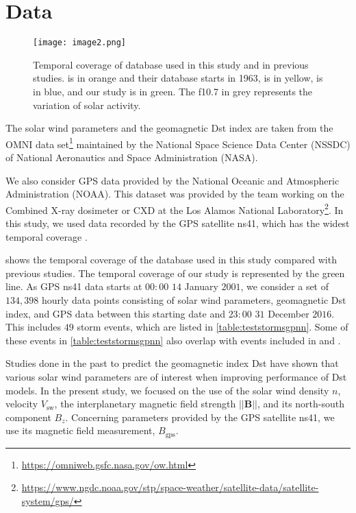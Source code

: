 \section{Data}\label{sec:datagpnn}

\begin{figure}
	\texttt{[image: image2.png]}
	\caption{Temporal coverage of database used in this study and in previous studies. \citet{wu1997geomagnetic} 
	is in orange and their database starts in 1963, \citet{Bala2012} is in yellow, \citet{Lazzus} is in blue, and our study is in green. 
	The f10.7 in grey represents the variation of solar activity.}
	\label{fig:datacoverage}
\end{figure}


The solar wind parameters and the geomagnetic Dst index are taken from the OMNI data 
set\footnote{\url{https://omniweb.gsfc.nasa.gov/ow.html}} maintained by the National Space Science 
Data Center (NSSDC) of National Aeronautics and Space Administration (NASA).

We also consider GPS data provided by the National Oceanic and Atmospheric Administration 
(NOAA). This dataset was provided by the team working on the Combined X-ray dosimeter or CXD at the 
Los Alamos National Laboratory\footnote{\url{https://www.ngdc.noaa.gov/stp/space-weather/satellite-data/satellite-system/gps/}}. 
In this study, we used data recorded by the GPS satellite ns41, which has the widest 
temporal coverage \citep{morley2017energetic}. 

 shows the temporal coverage of the database used in this study compared 
with previous studies. The temporal coverage of our study is represented by the green line. As GPS 
ns41 data starts at $00:00$ $14$ January $2001$, we consider a set of $134,398$ hourly data points 
consisting of solar wind parameters, geomagnetic Dst index, and GPS data between this starting 
date and $23:00$ $31$ December $2016$. This includes $49$ storm events, which are listed in 
\cref{table:teststormsgpnn}. Some of these events in \cref{table:teststormsgpnn} also overlap with 
events included in \citet{Ji2012} and \citet{ChandorkarDst}. 

Studies done in the past to predict the geomagnetic index Dst have shown that various solar wind 
parameters are of interest when improving performance of Dst models. In the present study, we 
focused on the use of the solar wind density $n$, velocity $V_{\text{sw}}$, the interplanetary 
magnetic field strength $\rvert\rvert\mathbf{B}\rvert\rvert$, and its north-south component 
$B_{z}$. Concerning parameters provided by the GPS satellite ns41, we use its magnetic field
measurement, $B_{\text{gps}}$.

